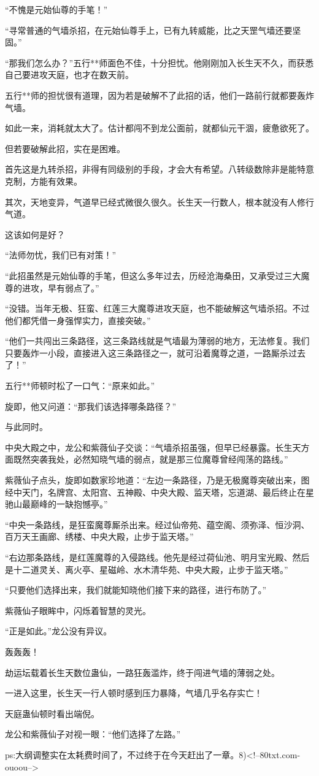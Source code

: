 \begin{this_body}
“不愧是元始仙尊的手笔！”

“寻常普通的气墙杀招，在元始仙尊手上，已有九转威能，比之天罡气墙还要坚固。”

“那我们怎么办？”五行**师面色不佳，十分担忧。他刚刚加入长生天不久，而获悉自己要进攻天庭，也才在数天前。

五行**师的担忧很有道理，因为若是破解不了此招的话，他们一路前行就都要轰炸气墙。

如此一来，消耗就太大了。估计都闯不到龙公面前，就都仙元干涸，疲惫欲死了。

但若要破解此招，实在是困难。

首先这是九转杀招，非得有同级别的手段，才会大有希望。八转级数除非是能特意克制，方能有效果。

其次，天地变异，气道早已经式微很久很久。长生天一行数人，根本就没有人修行气道。

这该如何是好？

“法师勿忧，我们已有对策！”

“此招虽然是元始仙尊的手笔，但这么多年过去，历经沧海桑田，又承受过三大魔尊的进攻，早有弱点了。”

“没错。当年无极、狂蛮、红莲三大魔尊进攻天庭，也不能破解这气墙杀招。不过他们都凭借一身强悍实力，直接突破。”

“他们一共闯出三条路径，这三条路线就是气墙最为薄弱的地方，无法修复。我们只要轰炸一小段，直接进入这三条路径之一，就可沿着魔尊之道，一路厮杀过去了！”

五行**师顿时松了一口气：“原来如此。”

旋即，他又问道：“那我们该选择哪条路径？”

与此同时。

中央大殿之中，龙公和紫薇仙子交谈：“气墙杀招虽强，但早已经暴露。长生天方面既然突袭我处，必然知晓气墙的弱点，就是那三位魔尊曾经闯荡的路线。”

紫薇仙子点头，旋即如数家珍地道：“左边一条路径，乃是无极魔尊突破出来，图经中天门，名牌宫、太阳宫、五神殿、中央大殿、监天塔，忘道湖、最后终止在星驰山最巅峰的一缺抱憾亭。”

“中央一条路线，是狂蛮魔尊厮杀出来。经过仙帝苑、蕴空阁、须弥泽、恒沙洞、百万天王画廊、绣楼、中央大殿，止步于监天塔。”

“右边那条路线，是红莲魔尊的入侵路线。他先是经过荷仙池、明月宝光殿、然后是十二道灵关、离火亭、星磁岭、水木清华苑、中央大殿，止步于监天塔。”

“只要他们选择出来，我们就能知晓他们接下来的路径，进行布防了。”

紫薇仙子眼眸中，闪烁着智慧的灵光。

“正是如此。”龙公没有异议。

轰轰轰！

劫运坛载着长生天数位蛊仙，一路狂轰滥炸，终于闯进气墙的薄弱之处。

一进入这里，长生天一行人顿时感到压力暴降，气墙几乎名存实亡！

天庭蛊仙顿时看出端倪。

龙公和紫薇仙子对视一眼：“他们选择了左路。”

ps:大纲调整实在太耗费时间了，不过终于在今天赶出了一章。8)<!--80txt.com-ouoou-->

\end{this_body}

